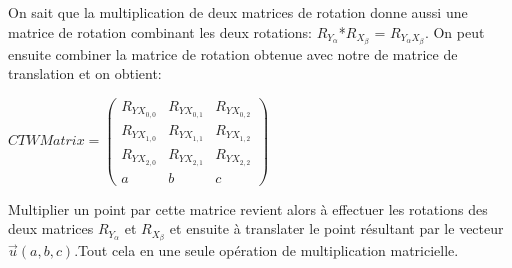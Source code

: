 \documentclass[../../Rapport RayTracer]{subfiles}
\begin{document}
On sait que la multiplication de deux matrices de rotation donne aussi une matrice de rotation combinant les deux rotations: $R_{Y_{\alpha}}$*$R_{X_{\beta}}$ = $R_{Y_{\alpha}X_{\beta}}$. On peut ensuite combiner la matrice de rotation obtenue avec notre de matrice de translation et on obtient:
\begin{center}
	$CTWMatrix =
	\begin{pmatrix}
		R_{YX_{0, 0}} & R_{YX_{0, 1}}  & R_{YX_{0, 2}}\\
		R_{YX_{1, 0}} & R_{YX_{1, 1}}  & R_{YX_{1, 2}}\\
		R_{YX_{2, 0}} & R_{YX_{2, 1}}  & R_{YX_{2, 2}}\\
		a & b & c
	\end{pmatrix}
	$
\end{center}

Multiplier un point par cette matrice revient alors à effectuer les rotations des deux matrices $R_{Y_{\alpha}}$ et $R_{X_{\beta}}$ et ensuite à translater le point résultant par le vecteur $\overrightarrow{u}(a, b, c)$.Tout cela en une seule opération de multiplication matricielle.
\end{document}

